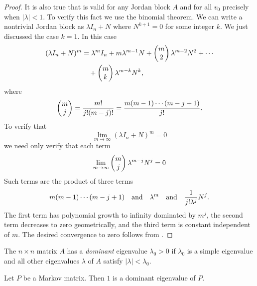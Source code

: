 \documentclass{ximera}
\begin{document}
\begin{proof}
It is also true that  is valid for any Jordan block 
$A$ and for all $v_0$ precisely when $|\lambda|<1$.  To verify this fact 
we use the binomial theorem.  
We can write a nontrivial Jordan block as
$\lambda I_n+N$ where $N^{k+1}=0$ for some integer $k$.  We just discussed 
the case $k=1$.  In this case
\begin{align*}
(\lambda I_n+N)^m &= \lambda^mI_n+m\lambda^{m-1}N + 
\left(\begin{array}{@{}c@{}} m\\2\end{array}\right)\lambda^{m-2}N^2
  +\cdots \\
  &\quad + 
\left(\begin{array}{@{}c@{}} m\\k \end{array}\right)\lambda^{m-k}N^k,
\end{align*}
where
\[
\left(\begin{array}{@{}c@{}} m \\ j\end{array}\right)
 = \frac{m!}{j!(m-j)!}=\frac{m(m-1)\cdots(m-j+1)}{j!}.
\]
To verify that 
\[
\lim_{m\to\infty}(\lambda I_n+N)^m = 0
\]
we need only verify that each term
\[
\lim_{m\to\infty}\left(\begin{array}{@{}c@{}} m\\j \end{array}\right)
\lambda^{m-j}N^j = 0
\]
Such terms are the product of three terms 
\[
m(m-1)\cdots(m-j+1) \quad\mbox{and}\quad \lambda^m \quad\mbox{and}\quad \frac{1}{j!\lambda^j}N^j.
\]
The first term has polynomial growth to infinity dominated by $m^j$, the 
second term decreases to zero geometrically, and the third term is 
constant independent of $m$. The desired convergence to zero follows from 
.  \end{proof}

\begin{definition}  The $n\times n$ matrix $A$ has a {\em dominant\/} eigenvalue 
$\lambda_0>0$ if $\lambda_0$ is a simple eigenvalue and all other eigenvalues
$\lambda$ of $A$ satisfy $|\lambda|<\lambda_0$.
\end{definition}


\begin{theorem}  \label{T:Markovdom}
Let $P$ be a Markov matrix. Then $1$ is a dominant eigenvalue of $P$.
\end{theorem}
\end{document}
